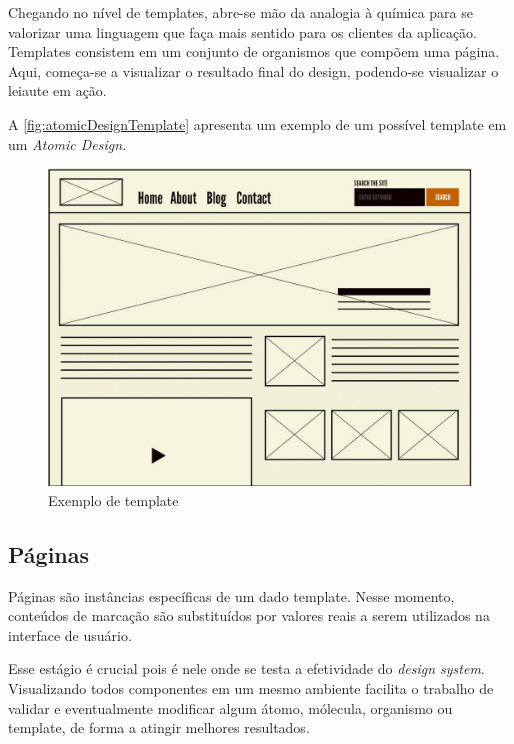 Chegando no nível de templates, abre-se mão da analogia à química para se valorizar uma linguagem que faça mais sentido para os clientes da aplicação. Templates consistem em um conjunto de organismos que compõem uma página. Aqui, começa-se a visualizar o resultado final do design, podendo-se visualizar o leiaute em ação.

A \autoref{fig:atomicDesignTemplate} apresenta um exemplo de um possível template em um \textit{Atomic Design}.

\begin{figure}
	\includegraphics[width=\linewidth]{./04-figuras/02_referencial_teorico/ad-template.png}
	\caption{Exemplo de template}
  \label{fig:atomicDesignTemplate}
\end{figure}

\subsection{Páginas}

Páginas são instâncias específicas de um dado template. Nesse momento, conteúdos de marcação são substituídos por valores reais a serem utilizados na interface de usuário.

Esse estágio é crucial pois é nele onde se testa a efetividade do \textit{design system}. Visualizando todos componentes em um mesmo ambiente facilita o trabalho de validar e eventualmente modificar algum átomo, mólecula, organismo ou template, de forma a atingir melhores resultados.
